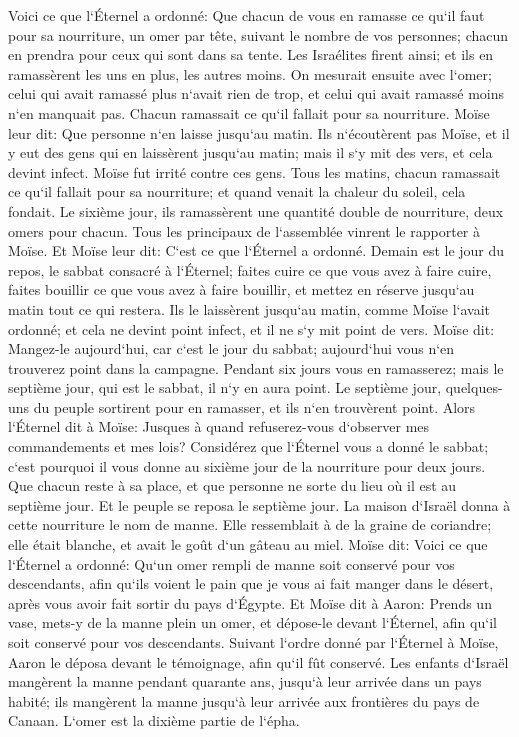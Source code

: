 \verse Voici ce que l`Éternel a ordonné: Que chacun de vous en ramasse ce qu`il faut pour sa nourriture, un omer par tête, suivant le nombre de vos personnes; chacun en prendra pour ceux qui sont dans sa tente. 
\verse Les Israélites firent ainsi; et ils en ramassèrent les uns en plus, les autres moins. 
\verse On mesurait ensuite avec l`omer; celui qui avait ramassé plus n`avait rien de trop, et celui qui avait ramassé moins n`en manquait pas. Chacun ramassait ce qu`il fallait pour sa nourriture. 
\verse Moïse leur dit: Que personne n`en laisse jusqu`au matin. 
\verse Ils n`écoutèrent pas Moïse, et il y eut des gens qui en laissèrent jusqu`au matin; mais il s`y mit des vers, et cela devint infect. Moïse fut irrité contre ces gens. 
\verse Tous les matins, chacun ramassait ce qu`il fallait pour sa nourriture; et quand venait la chaleur du soleil, cela fondait. 
\verse Le sixième jour, ils ramassèrent une quantité double de nourriture, deux omers pour chacun. Tous les principaux de l`assemblée vinrent le rapporter à Moïse. 
\verse Et Moïse leur dit: C`est ce que l`Éternel a ordonné. Demain est le jour du repos, le sabbat consacré à l`Éternel; faites cuire ce que vous avez à faire cuire, faites bouillir ce que vous avez à faire bouillir, et mettez en réserve jusqu`au matin tout ce qui restera. 
\verse Ils le laissèrent jusqu`au matin, comme Moïse l`avait ordonné; et cela ne devint point infect, et il ne s`y mit point de vers. 
\verse Moïse dit: Mangez-le aujourd`hui, car c`est le jour du sabbat; aujourd`hui vous n`en trouverez point dans la campagne. 
\verse Pendant six jours vous en ramasserez; mais le septième jour, qui est le sabbat, il n`y en aura point. 
\verse Le septième jour, quelques-uns du peuple sortirent pour en ramasser, et ils n`en trouvèrent point. 
\verse Alors l`Éternel dit à Moïse: Jusques à quand refuserez-vous d`observer mes commandements et mes lois? 
\verse Considérez que l`Éternel vous a donné le sabbat; c`est pourquoi il vous donne au sixième jour de la nourriture pour deux jours. Que chacun reste à sa place, et que personne ne sorte du lieu où il est au septième jour. 
\verse Et le peuple se reposa le septième jour. 
\verse La maison d`Israël donna à cette nourriture le nom de manne. Elle ressemblait à de la graine de coriandre; elle était blanche, et avait le goût d`un gâteau au miel. 
\verse Moïse dit: Voici ce que l`Éternel a ordonné: Qu`un omer rempli de manne soit conservé pour vos descendants, afin qu`ils voient le pain que je vous ai fait manger dans le désert, après vous avoir fait sortir du pays d`Égypte. 
\verse Et Moïse dit à Aaron: Prends un vase, mets-y de la manne plein un omer, et dépose-le devant l`Éternel, afin qu`il soit conservé pour vos descendants. 
\verse Suivant l`ordre donné par l`Éternel à Moïse, Aaron le déposa devant le témoignage, afin qu`il fût conservé. 
\verse Les enfants d`Israël mangèrent la manne pendant quarante ans, jusqu`à leur arrivée dans un pays habité; ils mangèrent la manne jusqu`à leur arrivée aux frontières du pays de Canaan. 
\verse L`omer est la dixième partie de l`épha. 

